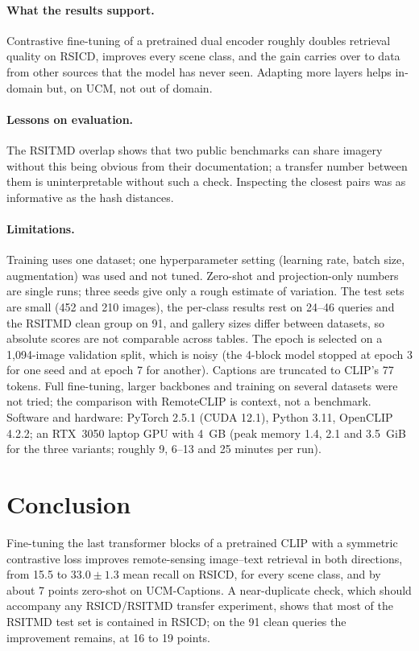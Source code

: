 \documentclass[11pt,a4paper]{article}
\begin{document}
\paragraph{What the results support.} Contrastive fine-tuning of a pretrained dual encoder roughly doubles retrieval quality on RSICD, improves every scene class, and the gain carries over to data from other sources that the model has never seen. Adapting more layers helps in-domain but, on UCM, not out of domain.
\paragraph{Lessons on evaluation.} The RSITMD overlap shows that two public benchmarks can share imagery without this being obvious from their documentation; a transfer number between them is uninterpretable without such a check. Inspecting the closest pairs was as informative as the hash distances.
\paragraph{Limitations.} Training uses one dataset; one hyperparameter setting (learning rate, batch size, augmentation) was used and not tuned. Zero-shot and projection-only numbers are single runs; three seeds give only a rough estimate of variation. The test sets are small (452 and 210 images), the per-class results rest on 24--46 queries and the RSITMD clean group on 91, and gallery sizes differ between datasets, so absolute scores are not comparable across tables. The epoch is selected on a 1{,}094-image validation split, which is noisy (the 4-block model stopped at epoch 3 for one seed and at epoch 7 for another). Captions are truncated to CLIP's 77 tokens. Full fine-tuning, larger backbones and training on several datasets were not tried; the comparison with RemoteCLIP is context, not a benchmark. Software and hardware: PyTorch \citep{paszke2019pytorch} 2.5.1 (CUDA 12.1), Python 3.11, OpenCLIP 4.2.2; an RTX~3050 laptop GPU with 4~GB (peak memory 1.4, 2.1 and 3.5~GiB for the three variants; roughly 9, 6--13 and 25 minutes per run).

\section{Conclusion}
Fine-tuning the last transformer blocks of a pretrained CLIP with a symmetric contrastive loss improves remote-sensing image--text retrieval in both directions, from 15.5 to $33.0\pm1.3$ mean recall on RSICD, for every scene class, and by about 7 points zero-shot on UCM-Captions. A near-duplicate check, which should accompany any RSICD/RSITMD transfer experiment, shows that most of the RSITMD test set is contained in RSICD; on the 91 clean queries the improvement remains, at 16 to 19 points.



\end{document}
